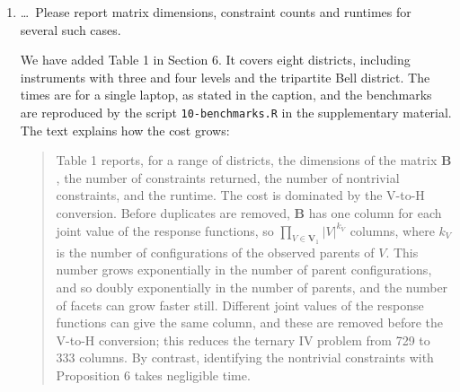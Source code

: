 \documentclass{article}
\newcommand{\bV}{\boldsymbol{V}}
\begin{document}
\begin{enumerate}
    \item \ldots\, Please report matrix dimensions, constraint counts and runtimes for several such cases.
    \begin{mdframed}
        We have added Table 1 in Section 6. It covers eight districts, including instruments with three and four levels and the tripartite Bell district. The times are for a single laptop, as stated in the caption, and the benchmarks are reproduced by the script \texttt{10-benchmarks.R} in the supplementary material. The text explains how the cost grows:
        \begin{quote}
        Table 1 reports, for a range of districts, the dimensions of the matrix $\boldsymbol{B}$, the number of constraints returned, the number of nontrivial constraints, and the runtime. The cost is dominated by the V-to-H conversion. Before duplicates are removed, $\boldsymbol{B}$ has one column for each joint value of the response functions, so $\prod_{V \in \bV_1} |V|^{k_V}$ columns, where $k_V$ is the number of configurations of the observed parents of $V$. This number grows exponentially in the number of parent configurations, and so doubly exponentially in the number of parents, and the number of facets can grow faster still. Different joint values of the response functions can give the same column, and these are removed before the V-to-H conversion; this reduces the ternary IV problem from 729 to 333 columns. By contrast, identifying the nontrivial constraints with Proposition 6 takes negligible time.
        \end{quote}
    \end{mdframed}




\end{enumerate}
\end{document}
